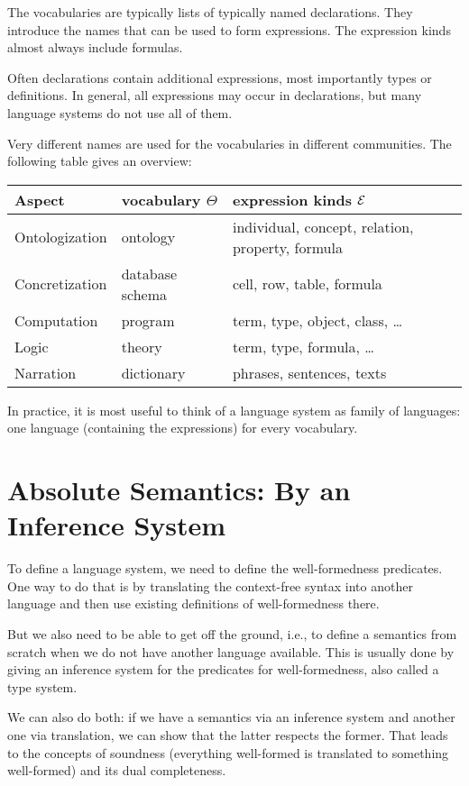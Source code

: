 The vocabularies are typically lists of typically named declarations.
They introduce the names that can be used to form expressions.
The expression kinds almost always include formulas.

Often declarations contain additional expressions, most importantly types or definitions.
In general, all expressions may occur in declarations, but many language systems do not use all of them.

Very different names are used for the vocabularies in different communities.
The following table gives an overview:

\begin{center}
\begin{tabular}{l|ll}
Aspect & vocabulary $\Theta$ & expression kinds $\mathcal{E}$ \\
\hline
Ontologization  & ontology & individual, concept, relation, property, formula \\
Concretization & database schema & cell, row, table, formula \\
Computation & program & term, type, object, class, \ldots \\
Logic & theory & term, type, formula, \ldots \\
Narration & dictionary & phrases, sentences, texts \\
\end{tabular}
\end{center}

In practice, it is most useful to think of a language system as family of languages: one language (containing the expressions) for every vocabulary.

\section{Absolute Semantics: By an Inference System}

To define a language system, we need to define the well-formedness predicates.
One way to do that is by translating the context-free syntax into another language and then use existing definitions of well-formedness there.

But we also need to be able to get off the ground, i.e., to define a semantics from scratch when we do not have another language available.
This is usually done by giving an inference system for the predicates for well-formedness, also called a type system.

We can also do both: if we have a semantics via an inference system and another one via translation, we can show that the latter respects the former.
That leads to the concepts of soundness (everything well-formed is translated to something well-formed) and its dual completeness.

